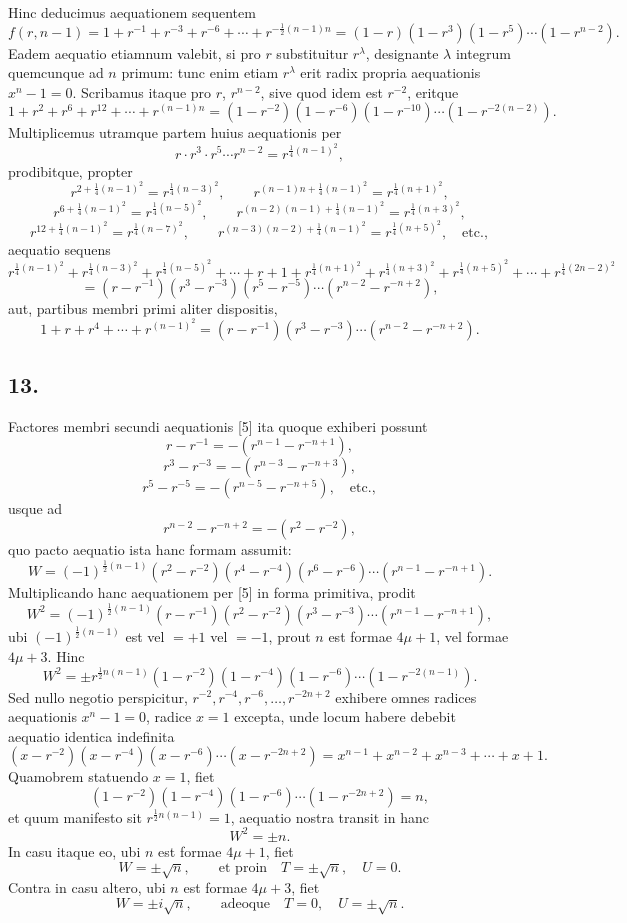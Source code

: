 \documentclass[12pt]{article}
\begin{document}
Hinc deducimus aequationem sequentem
\[
f(r,n-1)=1+r^{-1}+r^{-3}+r^{-6}+\cdots+r^{-\frac12(n-1)n}
=(1-r)(1-r^3)(1-r^5)\cdots(1-r^{n-2}).
\]
Eadem aequatio etiamnum valebit, si pro $r$ substituitur $r^\lambda$, designante $\lambda$ integrum quemcunque ad $n$ primum: tunc enim etiam $r^\lambda$ erit radix propria aequationis $x^n-1=0$. Scribamus itaque pro $r$, $r^{n-2}$, sive quod idem est $r^{-2}$, eritque
\[
1+r^2+r^6+r^{12}+\cdots+r^{(n-1)n}
=(1-r^{-2})(1-r^{-6})(1-r^{-10})\cdots(1-r^{-2(n-2)}).
\]
Multiplicemus utramque partem huius aequationis per
\[
r\cdot r^3\cdot r^5\cdots r^{n-2}=r^{\frac14(n-1)^2},
\]
prodibitque, propter
\[
r^{2+\frac14(n-1)^2}=r^{\frac14(n-3)^2},\qquad
r^{(n-1)n+\frac14(n-1)^2}=r^{\frac14(n+1)^2},
\]
\[
r^{6+\frac14(n-1)^2}=r^{\frac14(n-5)^2},\qquad
r^{(n-2)(n-1)+\frac14(n-1)^2}=r^{\frac14(n+3)^2},
\]
\[
r^{12+\frac14(n-1)^2}=r^{\frac14(n-7)^2},\qquad
r^{(n-3)(n-2)+\frac14(n-1)^2}=r^{\frac14(n+5)^2},\quad\text{etc.},
\]
aequatio sequens
\[
r^{\frac14(n-1)^2}+r^{\frac14(n-3)^2}+r^{\frac14(n-5)^2}+\cdots+r+1
+r^{\frac14(n+1)^2}+r^{\frac14(n+3)^2}+r^{\frac14(n+5)^2}+\cdots+r^{\frac14(2n-2)^2}
\]
\[
=(r-r^{-1})(r^3-r^{-3})(r^5-r^{-5})\cdots(r^{n-2}-r^{-n+2}),
\]
aut, partibus membri primi aliter dispositis,
\[
1+r+r^4+\cdots+r^{(n-1)^2}=(r-r^{-1})(r^3-r^{-3})\cdots(r^{n-2}-r^{-n+2}). \tag{5}
\]

\subsection*{13.}

Factores membri secundi aequationis [5] ita quoque exhiberi possunt
\[
r-r^{-1}=-(r^{n-1}-r^{-n+1}),
\]
\[
r^3-r^{-3}=-(r^{n-3}-r^{-n+3}),
\]
\[
r^5-r^{-5}=-(r^{n-5}-r^{-n+5}),\quad\text{etc.},
\]
usque ad
\[
r^{n-2}-r^{-n+2}=-(r^2-r^{-2}),
\]
quo pacto aequatio ista hanc formam assumit:
\[
W=(-1)^{\frac12(n-1)}(r^2-r^{-2})(r^4-r^{-4})(r^6-r^{-6})\cdots(r^{n-1}-r^{-n+1}).
\]
Multiplicando hanc aequationem per [5] in forma primitiva, prodit
\[
W^2=(-1)^{\frac12(n-1)}(r-r^{-1})(r^2-r^{-2})(r^3-r^{-3})\cdots(r^{n-1}-r^{-n+1}),
\]
ubi $(-1)^{\frac12(n-1)}$ est vel $=+1$ vel $=-1$, prout $n$ est formae $4\mu+1$, vel formae $4\mu+3$. Hinc
\[
W^2=\pm r^{\frac12 n(n-1)}(1-r^{-2})(1-r^{-4})(1-r^{-6})\cdots(1-r^{-2(n-1)}).
\]
Sed nullo negotio perspicitur, $r^{-2},r^{-4},r^{-6},\ldots,r^{-2n+2}$ exhibere omnes radices aequationis $x^n-1=0$, radice $x=1$ excepta, unde locum habere debebit aequatio identica indefinita
\[
(x-r^{-2})(x-r^{-4})(x-r^{-6})\cdots(x-r^{-2n+2})
=x^{n-1}+x^{n-2}+x^{n-3}+\cdots+x+1.
\]
Quamobrem statuendo $x=1$, fiet
\[
(1-r^{-2})(1-r^{-4})(1-r^{-6})\cdots(1-r^{-2n+2})=n,
\]
et quum manifesto sit $r^{\frac12 n(n-1)}=1$, aequatio nostra transit in hanc
\[
W^2=\pm n. \tag{6}
\]
In casu itaque eo, ubi $n$ est formae $4\mu+1$, fiet
\[
W=\pm\sqrt n,\qquad \text{et proin}\quad T=\pm\sqrt n,\quad U=0.
\]
Contra in casu altero, ubi $n$ est formae $4\mu+3$, fiet
\[
W=\pm i\sqrt n,\qquad \text{adeoque}\quad T=0,\quad U=\pm\sqrt n.
\]
\end{document}
